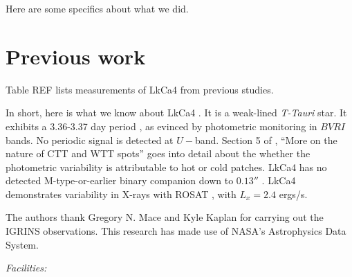 \documentclass[onecolumn]{emulateapj}%
\newcommand{\name}{LkCa4 }
\begin{document}
Here are some specifics about what we did.

\section{Previous work}

Table REF lists measurements of LkCa4 from previous studies.


In short, here is what we know about \name.  It is a weak-lined \emph{T-Tauri} star.  It exhibits a 3.36-3.37 day period \citep{1993AJ....106.1608V,1994IBVS.4042....1G}, as evinced by photometric monitoring in $BVRI$ bands.  No periodic signal is detected at $U-$band.  Section 5 of \citet{1993AJ....106.1608V}, ``More on the nature of CTT and WTT spots'' goes into detail about the whether the photometric variability is attributable to hot or cold patches.  \name has no detected M-type-or-earlier binary companion down to $0.13''$ \citep{1993A&A...278..129L}.  \name demonstrates variability in X-rays with ROSAT \citep{1994ApJ...424..237S}, with $L_{x}=2.4$ ergs/s.


\acknowledgements
The authors thank Gregory N. Mace and Kyle Kaplan for carrying out the IGRINS observations. This research has made use of NASA's Astrophysics Data System.

{\it Facilities:} 

\clearpage



\end{document}
